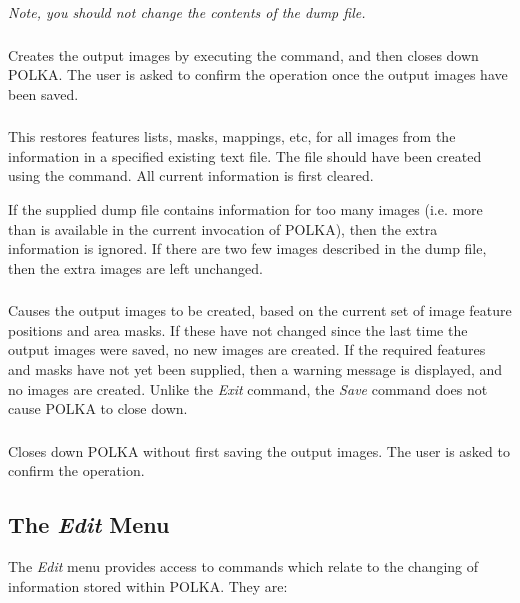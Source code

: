 {\em {\center Note, you should not change the contents of the dump file.}}

\subsubsection {} Creates the output images by executing
the  command, and then closes down
POLKA. The user is asked to confirm the operation once the output images
have been saved.

\subsubsection {} 
This restores features lists, masks, mappings, etc, for all images from 
the information in a specified existing text file. The file should have
been created using the  command. All
current information is first cleared. 

If the supplied dump file contains information for too many images (i.e.
more than is available in the current invocation of POLKA), then the
extra information is ignored. If there are two few images described in
the dump file, then the extra images are left unchanged.

\subsubsection {} Causes the output images to be
created, based on the current set of image feature positions and area masks. If
these have not changed since the last time the output images were saved,
no new images are created. If the required features and masks have not
yet been supplied, then a warning message is displayed, and no images are
created. Unlike the {\em Exit} command, the {\em Save} command does not
cause POLKA to close down.

\subsubsection {} Closes down POLKA without first saving the output
images. The user is asked to confirm the operation.

\subsection {The {\em Edit} Menu}
The {\em Edit} menu provides access to commands which relate to
the changing of information stored within POLKA. They are:

